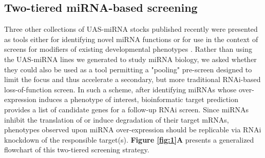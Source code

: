 \subsection*{Two-tiered miRNA-based screening}

Three other collections of UAS-miRNA stocks published recently were presented as tools either for identifying novel miRNA functions \cite{aleigh_Kim_Ni_Duan_et_al__2012,shauser_Forstemann_Basler_2012} or for use in the context of screens for modifiers of existing developmental phenotypes \cite{gler_Lim_Verma_Chen_Cohen_2012}.
Rather than using the UAS-miRNA lines we generated \cite{Suh_2015} to study miRNA biology, we asked whether they could also be used as a tool permitting a "pooling" pre-screen designed to limit the focus and thus accelerate a secondary, but more traditional RNAi-based loss-of-function screen.
In such a scheme, after identifying miRNAs whose over-expression induces a phenotype of interest, bioinformatic target prediction provides a list of candidate genes for a follow-up RNAi screen.
Since miRNAs inhibit the translation of or induce degradation of their target mRNAs, phenotypes observed upon miRNA over-expression should be replicable via RNAi knockdown of the responsible target(s).
\textbf{Figure \ref{fig:1}A} presents a generalized flowchart of this two-tiered screening strategy.